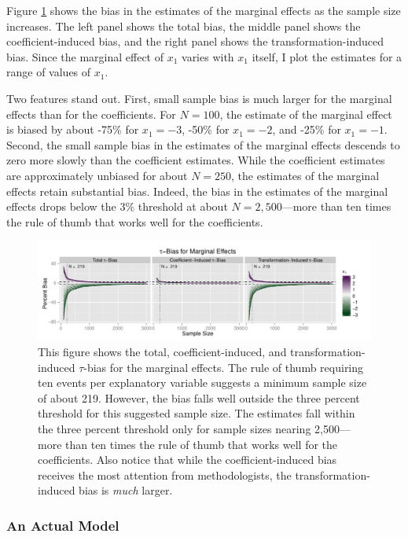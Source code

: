 \documentclass[12pt]{article}
\begin{document}
Figure \ref{fig:bias-me} shows the bias in the estimates of the marginal effects as the sample size increases. 
The left panel shows the total bias, the middle panel shows the coefficient-induced bias, and the right panel shows the transformation-induced bias.
Since the marginal effect of $x_1$ varies with $x_1$ itself, I plot the estimates for a range of values of $x_1$. 

Two features stand out. 
First, small sample bias is much larger for the marginal effects than for the coefficients. 
For $N = 100$, the estimate of the marginal effect is biased by about -75\% for $x_1 = -3$, -50\% for $x_1 = -2$, and -25\% for $x_1 = -1$. 
Second, the small sample bias in the estimates of the marginal effects descends to zero more slowly than the coefficient estimates.
While the coefficient estimates are approximately unbiased for about $N = 250$, the estimates of the marginal effects retain substantial bias. 
Indeed, the bias in the estimates of the marginal effects drops below the 3\% threshold at about $N = 2,500$---more than ten times the rule of thumb that works well for the coefficients. 

\begin{figure}[h!]
\begin{center}
\includegraphics[width = \textwidth]{figs/bias-me.pdf}
\caption{This figure shows the total, coefficient-induced, and transformation-induced $\tau$-bias for the marginal effects. The rule of thumb requiring ten events per explanatory variable suggests a minimum sample size of about 219. However, the bias falls well outside the three percent threshold for this suggested sample size. The estimates fall within the three percent threshold only for sample sizes nearing 2,500---more than ten times the rule of thumb that works well for the coefficients. Also notice that while the coefficient-induced bias receives the most attention from methodologists, the transformation-induced bias is \textit{much} larger.}\label{fig:bias-me}
\end{center}
\end{figure}

\subsubsection*{An Actual Model}
\end{document}
